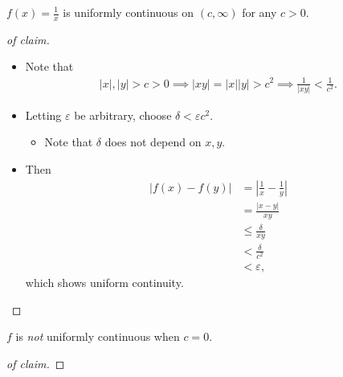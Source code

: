 \begin{solution}

\begin{claim}

\(f(x) = \frac 1 x\) is uniformly continuous on \((c, \infty)\) for any
\(c > 0\).

\end{claim}

\begin{proof}[of claim]

\envlist

\begin{itemize}
\item
  Note that
  \begin{align*}
  {\left\lvert {x} \right\rvert}, {\left\lvert {y} \right\rvert} > c > 0 \implies {\left\lvert {xy} \right\rvert} = {\left\lvert {x} \right\rvert}{\left\lvert {y} \right\rvert} > c^2 \implies \frac{1}{{\left\lvert {xy} \right\rvert}} < \frac 1 {c^{2}}
  .\end{align*}
\item
  Letting \(\varepsilon\) be arbitrary, choose
  \(\delta < \varepsilon c^2\).

  \begin{itemize}
  \tightlist
  \item
    Note that \(\delta\) does not depend on \(x, y\).
  \end{itemize}
\item
  Then
  \begin{align*}
  {\left\lvert {f(x) - f(y)} \right\rvert}
  &= {\left\lvert {\frac 1 x - \frac 1 y} \right\rvert} \\
  &= \frac{{\left\lvert {x-y} \right\rvert}}{xy} \\
  &\leq \frac{\delta}{xy} \\
  &< \frac{\delta}{c^2} \\
  &< \varepsilon
  ,\end{align*}
  which shows uniform continuity.
\end{itemize}

\end{proof}

\begin{claim}

\(f\) is \emph{not} uniformly continuous when \(c=0\).

\end{claim}

\begin{proof}[of claim]


\end{proof}
\end{solution}

